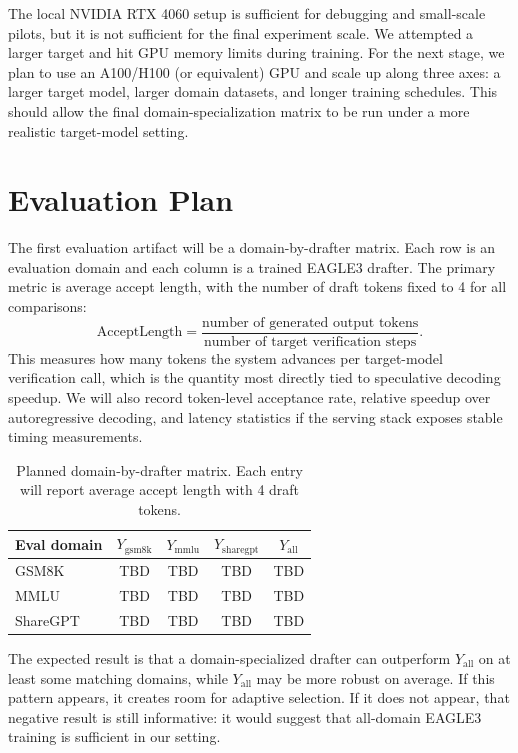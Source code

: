 \documentclass[11pt]{article}
\begin{document}
The local NVIDIA RTX 4060 setup is sufficient for debugging and small-scale pilots, but it is not sufficient for the final experiment scale. We attempted a larger target and hit GPU memory limits during training. For the next stage, we plan to use an A100/H100 (or equivalent) GPU and scale up along three axes: a larger target model, larger domain datasets, and longer training schedules. This should allow the final domain-specialization matrix to be run under a more realistic target-model setting.

\section{Evaluation Plan}

The first evaluation artifact will be a domain-by-drafter matrix. Each row is an evaluation domain and each column is a trained EAGLE3 drafter. The primary metric is average accept length, with the number of draft tokens fixed to 4 for all comparisons:
\begin{equation}
    \mathrm{AcceptLength} =
    \frac{\text{number of generated output tokens}}{\text{number of target verification steps}}.
\end{equation}
This measures how many tokens the system advances per target-model verification call, which is the quantity most directly tied to speculative decoding speedup. We will also record token-level acceptance rate, relative speedup over autoregressive decoding, and latency statistics if the serving stack exposes stable timing measurements.

\begin{table}[h]
\centering
\small
\begin{tabular}{lcccc}
\toprule
Eval domain & $Y_{\mathrm{gsm8k}}$ & $Y_{\mathrm{mmlu}}$ & $Y_{\mathrm{sharegpt}}$ & $Y_{\mathrm{all}}$ \\
\midrule
GSM8K & TBD & TBD & TBD & TBD \\
MMLU & TBD & TBD & TBD & TBD \\
ShareGPT & TBD & TBD & TBD & TBD \\
\bottomrule
\end{tabular}
\caption{Planned domain-by-drafter matrix. Each entry will report average accept length with 4 draft tokens.}
\label{tab:domain-matrix}
\end{table}

The expected result is that a domain-specialized drafter can outperform $Y_{\mathrm{all}}$ on at least some matching domains, while $Y_{\mathrm{all}}$ may be more robust on average. If this pattern appears, it creates room for adaptive selection. If it does not appear, that negative result is still informative: it would suggest that all-domain EAGLE3 training is sufficient in our setting.
\end{document}

